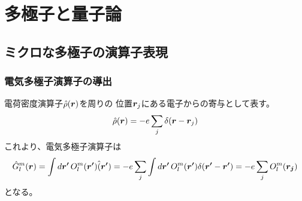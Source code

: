 \documentclass[../../master.tex]{subfiles}
\begin{document}
\chapter{多極子と量子論}
\section{ミクロな多極子の演算子表現}
\subsection*{電気多極子演算子の導出}
電荷密度演算子\(\hat{\rho}(\vb*{r})\)を周りの
位置\(\vb*{r}_j\)にある電子からの寄与として表す。
\begin{equation}
    \hat{\rho}(\vb*{r}) = -e\sum_{j} \delta(\vb*{r}-\vb*{r}_j)
\end{equation}
これより、電気多極子演算子は
\begin{align}
    \hat{G}_l^m(\vb*{r})
    = \int d\vb*{r'}\, O_l^m(\vb*{r'}) \hat(\vb*{r'})
    =-e \sum_{j} \int d\vb*{r'}\, O_l^m(\vb*{r'}) \delta(\vb*{r'}-\vb*{r'})
    = -e \sum_{j} O_l^m(\vb*{r_j})
\end{align}
となる。
\end{document}
